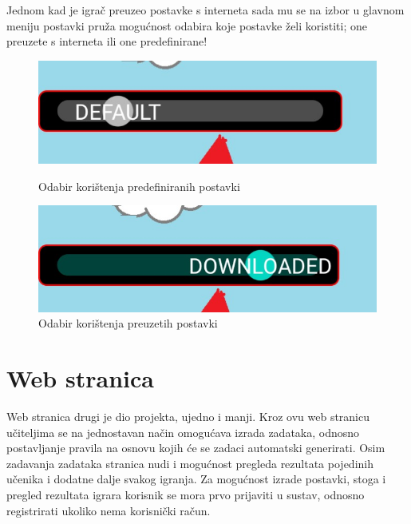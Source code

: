 \documentclass[times, utf8, zavrsni]{fer}
\begin{document}
		Jednom kad je igrač preuzeo postavke s interneta sada mu se na izbor u glavnom meniju postavki pruža mogućnost odabira koje postavke želi koristiti; one preuzete s interneta ili one predefinirane!
		
				\begin{figure}[!htb]
			\begin{minipage}{0.48\textwidth}
				\centering
				\includegraphics[scale=0.25]{"slike/usedefault.jpg"} 
				\caption{Odabir korištenja predefiniranih postavki}
				\label{fig:saw1}
			\end{minipage}\hfill
			\begin{minipage}{0.48\textwidth}
				\centering
				\includegraphics[scale=0.25]{"slike/usedownloaded.jpg"} 
				\caption{Odabir korištenja preuzetih postavki}
				\label{fig:saw2}
			\end{minipage}
		\end{figure}
		
		

	\section{Web stranica}
	Web stranica drugi je dio projekta, ujedno i manji. Kroz ovu web stranicu učiteljima se na jednostavan način omogućava izrada zadataka, odnosno postavljanje pravila na osnovu kojih će se zadaci automatski generirati.
	Osim zadavanja zadataka stranica nudi i mogućnost pregleda rezultata pojedinih učenika i dodatne dalje svakog igranja. Za mogućnost izrade postavki, stoga i pregled rezultata igrara korisnik se mora prvo prijaviti u sustav, odnosno
	registrirati ukoliko nema korisnički račun.
\end{document}
